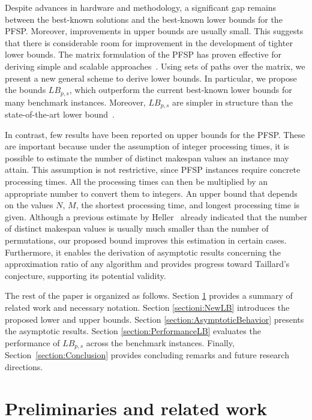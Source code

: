\documentclass{article}
\theoremstyle{thmstyleone}%
\theoremstyle{thmstyletwo}%
\theoremstyle{thmstylethree}%
\begin{document}
Despite advances in hardware and methodology, a significant gap remains between the best-known solutions and the best-known lower bounds for the PFSP. 
Moreover, improvements in upper bounds are usually small. 
This suggests that there is considerable room for improvement in the development of tighter lower bounds. 
The matrix formulation of the PFSP has proven effective for deriving simple and scalable approaches~\cite{MakespanDistribution, EfficientlySolvableCases}. 
Using sets of paths over the matrix, we present a new general scheme to derive lower bounds.
In particular, we propose the bounds $LB_{p,s}$, which outperform the current best-known lower bounds for many benchmark instances. 
Moreover, $LB_{p,s}$ are simpler in structure than the state-of-the-art lower bound~\cite{LowerBoundsNew}. 

In contrast, few results have been reported on upper bounds for the PFSP. 
These are important because under the assumption of integer processing times, it is possible to estimate the number of distinct makespan values an instance may attain. 
This assumption is not restrictive, since PFSP instances require concrete processing times. All the processing times can then be multiplied by an appropriate number to convert them to integers. 
An upper bound that depends on the values $N$, $M$, the shortest processing time, and longest processing time is given. 
Although a previous estimate by Heller~\cite{Heller} already indicated that the number of distinct makespan values is usually much smaller than the number of permutations, our proposed bound improves this estimation in certain cases. 
Furthermore, it enables the derivation of asymptotic results concerning the approximation ratio of any algorithm and provides progress toward Taillard's conjecture, supporting its potential validity.
 
The rest of the paper is organized as follows. 
Section \ref{section:Preliminaries} provides a summary of related work and necessary notation. 
Section \ref{sectioni:NewLB} introduces the proposed lower and upper bounds.  
Section \ref{section:AsymptoticBehavior} presents the asymptotic results. 
Section \ref{section:PerformanceLB} evaluates the performance of $LB_{p,s}$ across the benchmark instances. 
Finally, Section~\ref{section:Conclusion} provides concluding remarks and future research directions. 


\section{Preliminaries and related work}
\label{section:Preliminaries}
\end{document}
